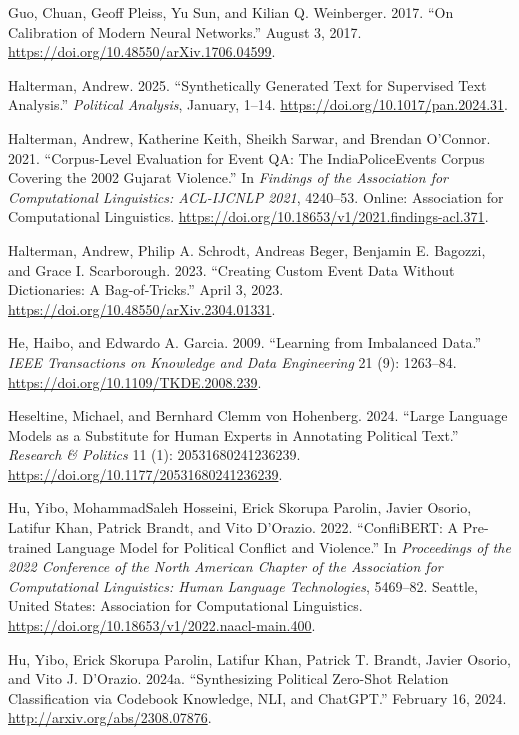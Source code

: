 \documentclass[
  11pt,
]{article}
\newlength{\cslhangindent}
\newenvironment{CSLReferences}[2] %
 {\begin{list}{}{%
  \setlength{\itemindent}{0pt}
  \setlength{\leftmargin}{0pt}
  \setlength{\parsep}{0pt}
  \ifodd #1
   \setlength{\leftmargin}{\cslhangindent}
   \setlength{\itemindent}{-1\cslhangindent}
  \fi
  \setlength{\itemsep}{#2\baselineskip}}}
 {\end{list}}
\begin{document}
\begin{CSLReferences}{1}{0}
Guo, Chuan, Geoff Pleiss, Yu Sun, and Kilian Q. Weinberger. 2017. {``On
{Calibration} of {Modern Neural Networks}.''} August 3, 2017.
\url{https://doi.org/10.48550/arXiv.1706.04599}.

Halterman, Andrew. 2025. {``Synthetically Generated Text for Supervised
Text Analysis.''} \emph{Political Analysis}, January, 1--14.
\url{https://doi.org/10.1017/pan.2024.31}.

Halterman, Andrew, Katherine Keith, Sheikh Sarwar, and Brendan O'Connor.
2021. {``Corpus-{Level Evaluation} for {Event QA}: {The
IndiaPoliceEvents Corpus Covering} the 2002 {Gujarat Violence}.''} In
\emph{Findings of the {Association} for {Computational Linguistics}:
{ACL-IJCNLP} 2021}, 4240--53. Online: Association for Computational
Linguistics. \url{https://doi.org/10.18653/v1/2021.findings-acl.371}.

Halterman, Andrew, Philip A. Schrodt, Andreas Beger, Benjamin E.
Bagozzi, and Grace I. Scarborough. 2023. {``Creating {Custom Event Data
Without Dictionaries}: {A Bag-of-Tricks}.''} April 3, 2023.
\url{https://doi.org/10.48550/arXiv.2304.01331}.

He, Haibo, and Edwardo A. Garcia. 2009. {``Learning from {Imbalanced
Data}.''} \emph{IEEE Transactions on Knowledge and Data Engineering} 21
(9): 1263--84. \url{https://doi.org/10.1109/TKDE.2008.239}.

Heseltine, Michael, and Bernhard Clemm von Hohenberg. 2024. {``Large
Language Models as a Substitute for Human Experts in Annotating
Political Text.''} \emph{Research \& Politics} 11 (1):
20531680241236239. \url{https://doi.org/10.1177/20531680241236239}.

Hu, Yibo, MohammadSaleh Hosseini, Erick Skorupa Parolin, Javier Osorio,
Latifur Khan, Patrick Brandt, and Vito D'Orazio. 2022. {``{ConfliBERT}:
{A Pre-trained Language Model} for {Political Conflict} and
{Violence}.''} In \emph{Proceedings of the 2022 {Conference} of the
{North American Chapter} of the {Association} for {Computational
Linguistics}: {Human Language Technologies}}, 5469--82. Seattle, United
States: Association for Computational Linguistics.
\url{https://doi.org/10.18653/v1/2022.naacl-main.400}.

Hu, Yibo, Erick Skorupa Parolin, Latifur Khan, Patrick T. Brandt, Javier
Osorio, and Vito J. D'Orazio. 2024a. {``Synthesizing {Political
Zero-Shot Relation Classification} via {Codebook Knowledge}, {NLI}, and
{ChatGPT}.''} February 16, 2024. \url{http://arxiv.org/abs/2308.07876}.


\end{CSLReferences}
\end{document}
